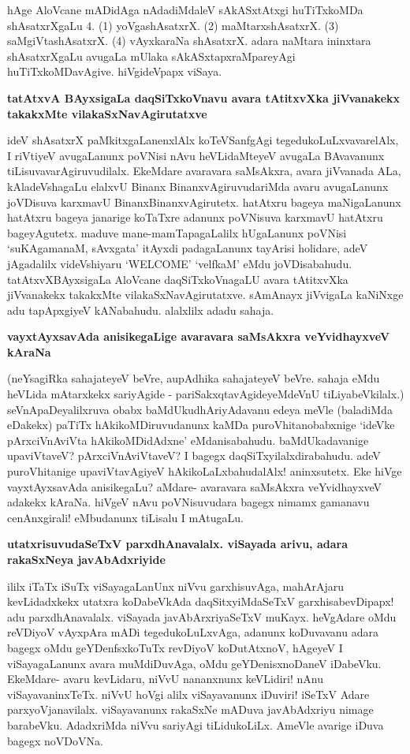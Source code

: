 hAge AloVcane mADidAga nAdadiMdaleV sAkASxtAtxgi huTiTxkoMDa shAsatxrXgaLu 4. (1) yoVgashAsatxrX. (2) maMtarxshAsatxrX. (3) saMgiVtashAsatxrX. (4) vAyxkaraNa shAsatxrX. adara naMtara ininxtara shAsatxrXgaLu avugaLa mUlaka sAkASxtapxraMpareyAgi huTiTxkoMDavAgive. hiVgideVpapx viSaya.

{\bf tatAtxvA BAyxsigaLa daqSiTxkoVnavu avara tAtitxvXka jiVvanakekx takakxMte vilakaSxNavAgirutatxve}

ideV shAsatxrX paMkitxgaLanenxlAlx koTeVSanfgAgi tegedukoLuLxvavarelAlx, I riVtiyeV avugaLanunx poVNisi nAvu heVLidaMteyeV avugaLa BAvavanunx tiLisuvavarAgiruvudilalx. EkeMdare avaravara saMsAkxra, avara jiVvanada ALa, kAladeVshagaLu elalxvU Binanx BinanxvAgiruvudariMda avaru avugaLanunx joVDisuva karxmavU BinanxBinanxvAgirutetx. hatAtxru bageya maNigaLanunx hatAtxru bageya janarige koTaTxre adanunx poVNisuva karxmavU hatAtxru bageyAgutetx. maduve mane-mamTapagaLalilx hUgaLanunx poVNisi `suKAgamanaM, sAvxgata' itAyxdi padagaLanunx tayArisi holidare, adeV jAgadalilx videVshiyaru {\rm `WELCOME'} `velfkaM' eMdu joVDisabahudu. tatAtxvXBAyxsigaLa AloVcane daqSiTxkoVnagaLU avara tAtitxvXka jiVvanakekx takakxMte vilakaSxNavAgirutatxve. sAmAnayx jiVvigaLa kaNiNxge adu tapApxgiyeV kANabahudu. alalxlilx adadu sahaja.

{\bf vayxtAyxsavAda anisikegaLige avaravara saMsAkxra veYvidhayxveV kAraNa}

(neYsagiRka sahajateyeV beVre, aupAdhika sahajateyeV beVre. sahaja eMdu heVLida mAtarxkekx sariyAgide - pariSakxqtavAgideyeMdeVnU tiLiyabeVkilalx.) seVnApaDeyalilxruva obabx baMdUkudhAriyAdavanu edeya meVle (baladiMda eDakekx) paTiTx hAkikoMDiruvudanunx kaMDa puroVhitanobabxnige `ideVke pArxciVnAviVta hAkikoMDidAdxne' eMdanisabahudu. baMdUkadavanige upaviVtaveV? pArxciVnAviVtaveV? I bagegx daqSiTxyilalxdirabahudu. adeV puroVhitanige upaviVtavAgiyeV hAkikoLaLxbahudalAlx! aninxsutetx. Eke hiVge vayxtAyxsavAda anisikegaLu? aMdare- avaravara saMsAkxra veYvidhayxveV adakekx kAraNa. hiVgeV nAvu poVNisuvudara bagegx nimamx gamanavu cenAnxgirali! eMbudanunx tiLisalu I mAtugaLu.

{\bf utatxrisuvudaSeTxV parxdhAnavalalx. viSayada arivu, adara rakaSxNeya javAbAdxriyide}

ililx iTaTx iSuTx viSayagaLanUnx niVvu garxhisuvAga, mahArAjaru kevLidadxkekx utatxra koDabeVkAda daqSitxyiMdaSeTxV garxhisabevDipapx! adu parxdhAnavalalx. viSayada javAbArxriyaSeTxV muKayx. heVgAdare oMdu reVDiyoV vAyxpAra mADi tegedukoLuLxvAga, adanunx koDuvavanu adara bagegx oMdu geYDenfsxkoTuTx revDiyoV koDutAtxnoV, hAgeyeV I viSayagaLanunx avara muMdiDuvAga, oMdu geYDenisxnoDaneV iDabeVku. EkeMdare- avaru kevLidaru, niVvU nananxnunx keVLidiri! nAnu viSayavaninxTeTx. niVvU hoVgi alilx viSayavanunx iDuviri! iSeTxV Adare parxyoVjanavilalx. viSayavanunx rakaSxNe mADuva javAbAdxriyu nimage barabeVku. AdadxriMda niVvu sariyAgi tiLidukoLiLx. AmeVle avarige iDuva bagegx noVDoVNa.

